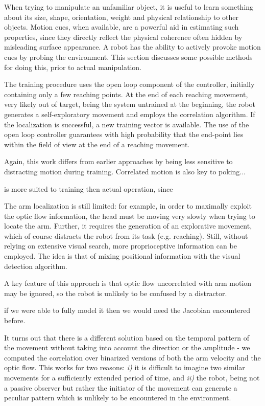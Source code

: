 When trying to manipulate an unfamiliar object, it is useful to
learn something about its size, shape, orientation, weight and
physical relationship to other objects.  Motion cues, when available,
are a powerful aid in estimating such properties, since
they directly reflect the physical coherence often hidden by
misleading surface appearance.  A robot has the ability to 
actively provoke motion cues by probing the environment.
This section discusses some possible methods for doing this,
prior to actual manipulation.


The training procedure uses the open loop component of the controller,
initially containing only a few reaching points. At the end of each
reaching movement, very likely out of target, being the system
untrained at the beginning, the robot generates a self-exploratory
movement and employs the correlation algorithm. If the localization is
successful, a new training vector is available. The use of the open
loop controller guarantees with high probability that the end-point
lies within the field of view at the end of a reaching movement.

Again, this work differs from earlier approaches by being less sensitive
to distracting motion during training.  Correlated motion is also
key to poking...

is more suited to
training then actual operation, since


The arm localization is still limited: for example, in order to
maximally exploit the optic flow information, the head must be moving
very slowly when trying to locate the arm. Further, it requires the
generation of an explorative movement, which of course distracts the
robot from its task (e.g. reaching). Still, without relying on
extensive visual search, more proprioceptive information can be
employed. The idea is that of mixing positional information with the
visual detection algorithm.

A key feature of this approach is that optic flow uncorrelated with
arm motion may be ignored, so the robot is unlikely to be confused by
a distractor.

if we were able to fully model it then we
would need the Jacobian encountered before.

It turns out
that there is a different solution based on the temporal pattern of
the movement without taking into account the direction or the
amplitude - we computed the correlation over binarized versions of
both the arm velocity and the optic flow. This works for two reasons:
{\em i)} it is difficult to imagine two similar movements for a
sufficiently extended period of time, and {\em ii)} the robot, being
not a passive observer but rather the initiator of the movement can
generate a peculiar pattern which is unlikely to be encountered in the
environment.


